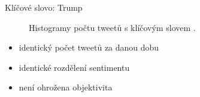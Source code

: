\documentclass[notheorems,12pt]{beamer}
\begin{document}
\begin{frame}{Klíčové slovo: Trump}
    \begin{figure}
        \centering
        \vspace{-0.7cm}
        \caption*{Histogramy počtu tweetů s klíčovým slovem \textit{}.}
    \end{figure}
	\begin{itemize}
		\item identický počet tweetů za danou dobu
        \item identické rozdělení sentimentu
        \item není ohrožena objektivita
	\end{itemize}
\end{frame}
\end{document}
